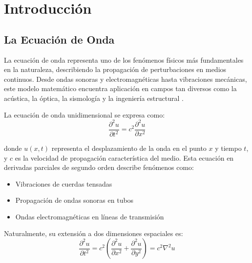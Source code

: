 \documentclass[a4paper]{article}
\begin{document}


\maketitle

\tableofcontents
\newpage

\section{Introducción}

\subsection{La Ecuación de Onda}

La ecuación de onda representa uno de los fenómenos físicos más fundamentales en la naturaleza, describiendo la propagación de
perturbaciones en medios continuos. Desde ondas sonoras y electromagnéticas hasta vibraciones mecánicas, este modelo matemático
encuentra aplicación en campos tan diversos como la acústica, la óptica, la sismología y la ingeniería estructural \cite{strauss2008partial}.

La ecuación de onda unidimensional se expresa como:
\begin{equation}
    \frac{\partial^2 u}{\partial t^2} = c^2 \frac{\partial^2 u}{\partial x^2}
\end{equation}

donde $u(x,t)$ representa el desplazamiento de la onda en el punto $x$ y tiempo $t$, y $c$ es la velocidad de propagación característica del medio. Esta ecuación en derivadas parciales de segundo orden describe fenómenos como:

\begin{itemize}
    \item Vibraciones de cuerdas tensadas
    \item Propagación de ondas sonoras en tubos
    \item Ondas electromagnéticas en líneas de transmisión
\end{itemize}

Naturalmente, su extensión a dos dimensiones espaciales es:
\begin{equation}
    \frac{\partial^2 u}{\partial t^2} = c^2 \left(\frac{\partial^2 u}{\partial x^2} + \frac{\partial^2 u}{\partial y^2}\right) = c^2 \nabla^2 u
\end{equation}
\end{document}
